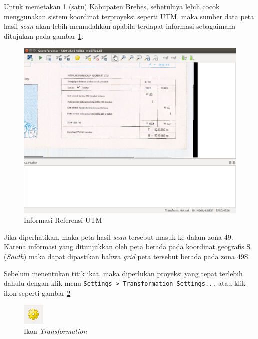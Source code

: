 \begin{enumerate}[1.]
  Untuk memetakan 1 (satu) Kabupaten Brebes, sebetulnya lebih cocok menggunakan sistem koordinat terproyeksi seperti UTM, maka sumber data peta hasil \textit{scan} akan lebih memudahkan apabila terdapat informasi sebagaimana ditujukan pada gambar \ref{fig:refutm}.
  
  \begin{figure}[H]
    \centering
    \includegraphics[width=1\textwidth]{./resources/024-utmpeta}
    \caption{Informasi Referensi UTM}
    \label{fig:refutm}
  \end{figure}
  
  Jika diperhatikan, maka peta hasil \textit{scan} tersebut masuk ke dalam zona 49. Karena informasi yang ditunjukkan oleh peta berada pada koordinat geografis S (\textit{South}) maka dapat dipastikan bahwa \textit{grid} peta tersebut berada pada zona 49S.
  
  Sebelum menentukan titik ikat, maka diperlukan proyeksi yang tepat terlebih dahulu dengan klik menu \verb|Settings > Transformation Settings...| atau klik ikon seperti gambar \ref{fig:transformationicon}
  
  \begin{figure}[H]
    \centering
    \includegraphics[scale=1]{./resources/025-icon-transformation}
    \caption{Ikon \textit{Transformation}}
    \label{fig:transformationicon}
  \end{figure}
  

\end{enumerate}
